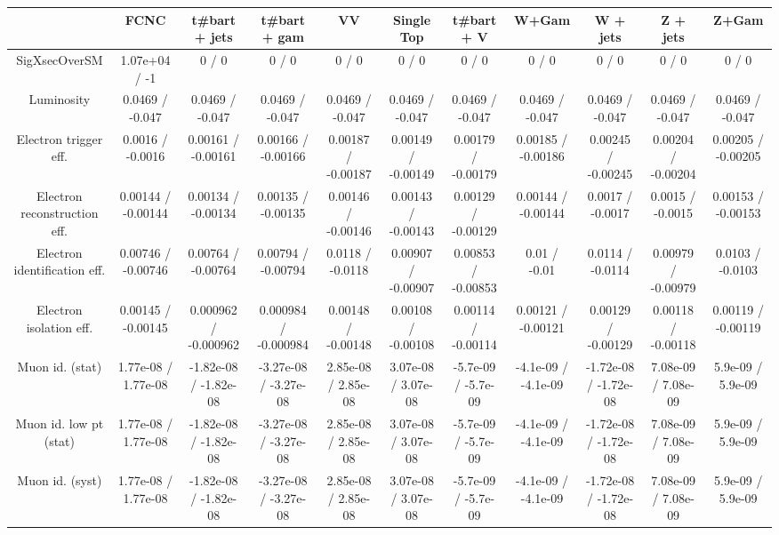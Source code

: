 \begin{table}[htbp]
\begin{center}
\footnotesize
\begin{tabular}{|c|c|c|c|c|c|c|c|c|c|c|}
\hline 
      & FCNC      & t#bar{t} + jets      & t#bar{t} +  gam      & VV      & Single Top      & t#bar{t} + V      & W+Gam      & W + jets      & Z + jets      & Z+Gam \\ 
\hline 
 SigXsecOverSM & 1.07e+04 / -1 & 0 / 0 & 0 / 0 & 0 / 0 & 0 / 0 & 0 / 0 & 0 / 0 & 0 / 0 & 0 / 0 & 0 / 0 \\ 
  Luminosity & 0.0469 / -0.047 & 0.0469 / -0.047 & 0.0469 / -0.047 & 0.0469 / -0.047 & 0.0469 / -0.047 & 0.0469 / -0.047 & 0.0469 / -0.047 & 0.0469 / -0.047 & 0.0469 / -0.047 & 0.0469 / -0.047 \\ 
  Electron trigger eff. & 0.0016 / -0.0016 & 0.00161 / -0.00161 & 0.00166 / -0.00166 & 0.00187 / -0.00187 & 0.00149 / -0.00149 & 0.00179 / -0.00179 & 0.00185 / -0.00186 & 0.00245 / -0.00245 & 0.00204 / -0.00204 & 0.00205 / -0.00205 \\ 
  Electron reconstruction eff. & 0.00144 / -0.00144 & 0.00134 / -0.00134 & 0.00135 / -0.00135 & 0.00146 / -0.00146 & 0.00143 / -0.00143 & 0.00129 / -0.00129 & 0.00144 / -0.00144 & 0.0017 / -0.0017 & 0.0015 / -0.0015 & 0.00153 / -0.00153 \\ 
  Electron identification eff. & 0.00746 / -0.00746 & 0.00764 / -0.00764 & 0.00794 / -0.00794 & 0.0118 / -0.0118 & 0.00907 / -0.00907 & 0.00853 / -0.00853 & 0.01 / -0.01 & 0.0114 / -0.0114 & 0.00979 / -0.00979 & 0.0103 / -0.0103 \\ 
  Electron isolation eff. & 0.00145 / -0.00145 & 0.000962 / -0.000962 & 0.000984 / -0.000984 & 0.00148 / -0.00148 & 0.00108 / -0.00108 & 0.00114 / -0.00114 & 0.00121 / -0.00121 & 0.00129 / -0.00129 & 0.00118 / -0.00118 & 0.00119 / -0.00119 \\ 
  Muon id. (stat) & 1.77e-08 / 1.77e-08 & -1.82e-08 / -1.82e-08 & -3.27e-08 / -3.27e-08 & 2.85e-08 / 2.85e-08 & 3.07e-08 / 3.07e-08 & -5.7e-09 / -5.7e-09 & -4.1e-09 / -4.1e-09 & -1.72e-08 / -1.72e-08 & 7.08e-09 / 7.08e-09 & 5.9e-09 / 5.9e-09 \\ 
  Muon id. low pt (stat) & 1.77e-08 / 1.77e-08 & -1.82e-08 / -1.82e-08 & -3.27e-08 / -3.27e-08 & 2.85e-08 / 2.85e-08 & 3.07e-08 / 3.07e-08 & -5.7e-09 / -5.7e-09 & -4.1e-09 / -4.1e-09 & -1.72e-08 / -1.72e-08 & 7.08e-09 / 7.08e-09 & 5.9e-09 / 5.9e-09 \\ 
  Muon id. (syst) & 1.77e-08 / 1.77e-08 & -1.82e-08 / -1.82e-08 & -3.27e-08 / -3.27e-08 & 2.85e-08 / 2.85e-08 & 3.07e-08 / 3.07e-08 & -5.7e-09 / -5.7e-09 & -4.1e-09 / -4.1e-09 & -1.72e-08 / -1.72e-08 & 7.08e-09 / 7.08e-09 & 5.9e-09 / 5.9e-09 \\ 

\end{tabular}
\end{center}
\end{table}
